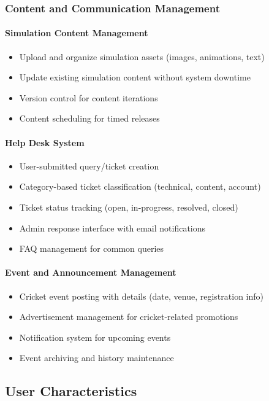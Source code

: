 \documentclass[12pt,a4paper]{article}
\begin{document}
\begin{enumerate}
\subsubsection{Content and Communication Management}
\paragraph{Simulation Content Management}
\begin{itemize}
    \item Upload and organize simulation assets (images, animations, text)
    \item Update existing simulation content without system downtime
    \item Version control for content iterations
    \item Content scheduling for timed releases
\end{itemize}

\paragraph{Help Desk System}
\begin{itemize}
    \item User-submitted query/ticket creation
    \item Category-based ticket classification (technical, content, account)
    \item Ticket status tracking (open, in-progress, resolved, closed)
    \item Admin response interface with email notifications
    \item FAQ management for common queries
\end{itemize}

\paragraph{Event and Announcement Management}
\begin{itemize}
    \item Cricket event posting with details (date, venue, registration info)
    \item Advertisement management for cricket-related promotions
    \item Notification system for upcoming events
    \item Event archiving and history maintenance
\end{itemize}

\subsection{User Characteristics}


\end{enumerate}
\end{document}
